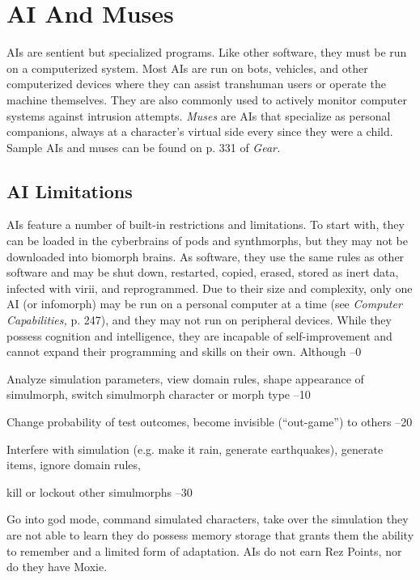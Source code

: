 \section{AI And Muses}

AIs are sentient but specialized programs. Like other 
software, they must be run on a computerized system. 
Most AIs are run on bots, vehicles, and other computerized
devices where they can assist transhuman
users or operate the machine themselves. They are also 
commonly used to actively monitor computer systems 
against intrusion attempts. \textit{Muses} are AIs that specialize
as personal companions, always at a character's
virtual side every since they were a child.
Sample AIs and muses can be found on p. 331 of \textit{Gear.}

\subsection{AI Limitations}

AIs feature a number of built-in restrictions and 
limitations. To start with, they can be loaded in the 
cyberbrains of pods and synthmorphs, but they may 
not be downloaded into biomorph brains. As software, 
they use the same rules as other software and may be 
shut down, restarted, copied, erased, stored as inert 
data, infected with virii, and reprogrammed. Due to 
their size and complexity, only one AI (or infomorph) 
may be run on a personal computer at a time (see 
\textit{Computer Capabilities,} p. 247), and they may not run 
on peripheral devices.
While they possess cognition and intelligence, they 
are incapable of self-improvement and cannot expand 
their programming and skills on their own. Although 
–0

Analyze simulation parameters, view domain rules, shape appearance of simulmorph, switch simulmorph character or morph type
–10

Change probability of test outcomes, become invisible (``out-game'') to others
–20

Interfere with simulation (e.g. make it rain, generate earthquakes), generate items, ignore domain rules, 

kill or lockout other simulmorphs
–30

Go into god mode, command simulated characters, take over the simulation
they are not able to learn they do possess memory 
storage that grants them the ability to remember and 
a limited form of adaptation. AIs do not earn Rez 
Points, nor do they have Moxie.

